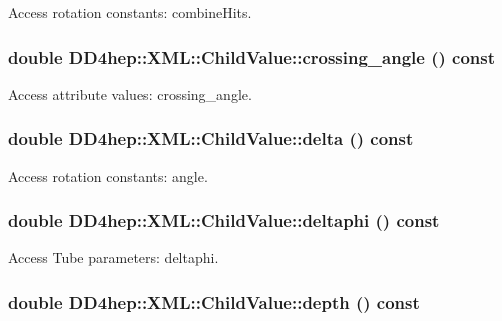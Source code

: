 Access rotation constants: combineHits. \hypertarget{struct_d_d4hep_1_1_x_m_l_1_1_child_value_a0b3d01727588ba4168694a63a70c7219}{
\subsubsection[{crossing\_\-angle}]{\setlength{\rightskip}{0pt plus 5cm}double DD4hep::XML::ChildValue::crossing\_\-angle () const}}
\label{struct_d_d4hep_1_1_x_m_l_1_1_child_value_a0b3d01727588ba4168694a63a70c7219}


Access attribute values: crossing\_\-angle. \hypertarget{struct_d_d4hep_1_1_x_m_l_1_1_child_value_a4f5e9e2b6d81d9accb2e1ac7ec989e3e}{
\subsubsection[{delta}]{\setlength{\rightskip}{0pt plus 5cm}double DD4hep::XML::ChildValue::delta () const}}
\label{struct_d_d4hep_1_1_x_m_l_1_1_child_value_a4f5e9e2b6d81d9accb2e1ac7ec989e3e}


Access rotation constants: angle. \hypertarget{struct_d_d4hep_1_1_x_m_l_1_1_child_value_a8818734b0188c7c2f6169950c107c5e0}{
\subsubsection[{deltaphi}]{\setlength{\rightskip}{0pt plus 5cm}double DD4hep::XML::ChildValue::deltaphi () const}}
\label{struct_d_d4hep_1_1_x_m_l_1_1_child_value_a8818734b0188c7c2f6169950c107c5e0}


Access Tube parameters: deltaphi. \hypertarget{struct_d_d4hep_1_1_x_m_l_1_1_child_value_ade9c12c3182b16cf12398551cc7be4f1}{
\subsubsection[{depth}]{\setlength{\rightskip}{0pt plus 5cm}double DD4hep::XML::ChildValue::depth () const}}
\label{struct_d_d4hep_1_1_x_m_l_1_1_child_value_ade9c12c3182b16cf12398551cc7be4f1}


